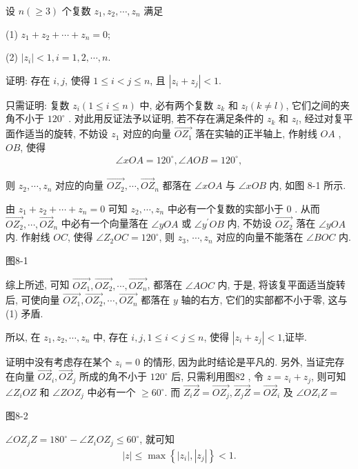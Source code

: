 \begin{example}
	设 $n(\geqslant 3)$ 个复数 $z_1, z_2, \cdots, z_n$ 满足

	(1) $z_1+z_2+\cdots+z_n=0$;

	(2) $\left|z_i\right|<1, i=1,2, \cdots, n$.

	证明: 存在 $i ,  j$, 使得 $1 \leqslant i<j \leqslant n$, 且 $\left|z_i+z_j\right|<1$.
\end{example}
\begin{solution}
	只需证明: 复数 $z_i(1 \leqslant i \leqslant n)$ 中, 必有两个复数 $z_k$ 和 $z_l(k \neq l)$, 它们之间的夹角不小于 $120^{\circ}$ .
	对此用反证法予以证明, 若不存在满足条件的 $z_k$ 和 $z_l$, 经过对复平面作适当的旋转, 不妨设 $z_1$ 对应的向量 $\overrightarrow{O Z_1}$ 落在实轴的正半轴上, 作射线 $O A$ ,  $O B$, 使得
	\begin{align*}
		\angle x O A=120^{\circ}, \angle A O B=120^{\circ},
	\end{align*}

	则 $z_2, \cdots, z_n$ 对应的向量 $\overrightarrow{O Z_2}, \cdots, \overrightarrow{O Z}_n$ 都落在 $\angle x O A$ 与 $\angle x O B$ 内, 如图 8-1 所示.

	由 $z_1+z_2+\cdots+z_n=0$ 可知 $z_2, \cdots, z_n$ 中必有一个复数的实部小于 0 . 从而 $\overrightarrow{O Z_2}, \cdots, \overrightarrow{O Z}_n$ 中必有一个向量落在 $\angle y O A$ 或 $\angle y^{\prime} O B$ 内, 不妨设 $\overrightarrow{O Z_2}$ 落在 $\angle y O A$ 内. 作射线 $O C$, 使得 $\angle Z_2 O C=120^{\circ}$, 则 $z_3$, $\cdots, z_n$ 对应的向量不能落在 $\angle B O C$ 内.

	图8-1

	综上所述, 可知 $\overrightarrow{O Z_1}, \overrightarrow{O Z_2}, \cdots, \overrightarrow{O Z_n}$, 都落在 $\angle A O C$ 内, 于是, 将该复平面适当旋转后, 可使向量 $\overrightarrow{O Z_1}, \overrightarrow{O Z_2}, \cdots, \overrightarrow{O Z_n}$ 都落在 $y$ 轴的右方, 它们的实部都不小于零, 这与 (1) 矛盾.

	所以, 在 $z_1, z_2, \cdots, z_n$ 中, 存在 $i ,  j, 1 \leqslant i<j \leqslant n$, 使得 $\left|z_i+z_j\right|<1$,证毕.
\end{solution}
\begin{note}
	证明中没有考虑存在某个 $z_i=0$ 的情形, 因为此时结论是平凡的. 另外, 当证完存在向量 $\overrightarrow{O Z}_i ,  \overrightarrow{O Z}_j$ 所成的角不小于 $120^{\circ}$ 后, 只需利用图82 , 令 $z=z_i+z_j$, 则可知 $\angle Z_i O Z$ 和 $\angle Z O Z_j$ 中必有一个 $\geqslant 60^{\circ}$. 而 $\overrightarrow{Z_i Z}=\overrightarrow{O Z_j}, \overrightarrow{Z_j Z}=\overrightarrow{O Z}_i$ 及 $\angle O Z_i Z=$

	图8-2

	$\angle O Z_j Z=180^{\circ}-\angle Z_i O Z_j \leqslant 60^{\circ}$, 就可知
	\begin{align*}
		|z| \leqslant \max \left\{\left|z_i\right|,\left|z_j\right|\right\}<1 .
	\end{align*}
\end{note}

